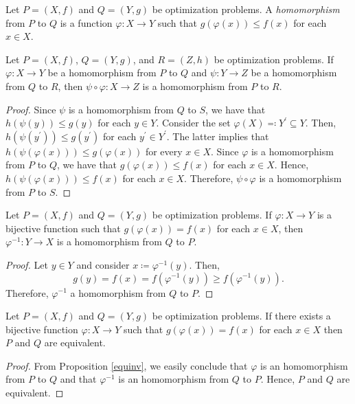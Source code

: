 \documentclass[a4paper]{article}
\begin{document}
\begin{definition}
Let $P=(X,f)$ and $Q=(Y,g)$ be optimization problems. A \emph{homomorphism} from $P$ to $Q$ is a function $\varphi\colon X\to Y$ such that $g(\varphi(x))\leq f(x)$ for each $x\in X$.

\end{definition}

\begin{lemma}\label{optitrans}
Let $P=(X,f)$, $Q=(Y,g)$, and $R=(Z,h)$ be optimization problems. If $\varphi\colon X\to Y$ be a homomorphism from $P$ to $Q$ and $\psi\colon Y\to Z$ be a homomorphism from $Q$ to $R$, then $\psi\circ\varphi\colon X\to Z$ is a homomorphism from $P$ to $R$. 
\end{lemma}
\begin{proof}
 Since $\psi$ is a homomorphism from $Q$ to $S$, we have that $h(\psi(y))\leq
 g(y)$ for each $y\in Y$. Consider the set $\varphi(X)\eqqcolon Y^\prime\subseteq Y$. Then, $h(\psi(y^\prime))\leq g(y^\prime)$ for each $y^\prime\in Y^\prime$. The latter implies that $h(\psi(\varphi(x)))\leq g(\varphi(x))$ for every $x\in X$. Since $\varphi$ is a homomorphism from $P$ to $Q$, we have that $g(\varphi(x))\leq f(x)$ for each $x\in X$. Hence, $h(\psi(\varphi(x)))\leq f(x)$ for each $x\in X$. Therefore, $\psi\circ\varphi$ is a homomorphism from $P$ to $S$.
\end{proof}
\begin{lemma}\label{equinv}
Let $P=(X,f)$ and $Q=(Y,g)$ be optimization problems. If $\varphi\colon X\to Y$ is a bijective function such that $g(\varphi(x))=f(x)$ for each $x\in X$, then $\varphi^{-1}\colon Y\to X$ is a homomorphism from $Q$ to $P$.
\end{lemma}
\begin{proof}
Let $y\in Y$ and consider $x\coloneqq\varphi^{-1}(y)$. Then,
$$g(y)=f(x)=f(\varphi^{-1}(y))\geq f(\varphi^{-1}(y)).$$
Therefore, $\varphi^{-1}$ a homomorphism from $Q$ to $P$.
\end{proof}
\begin{corollary}\label{id}
Let $P=(X,f)$ and $Q=(Y,g)$ be optimization problems. If there exists  a bijective function $\varphi\colon X\to Y$ such that $g(\varphi(x))=f(x)$ for each $x\in X$ then $P$ and $Q$ are equivalent.
\end{corollary}
\begin{proof}
 From Proposition \ref{equinv}, we easily conclude that \(\varphi\) is an
 homomorphism from \(P\) to \(Q\) and that \(\varphi^{-1}\) is an homomorphism
 from \(Q\) to \(P\). Hence, \(P\) and \(Q\) are equivalent.
\end{proof}
\end{document}
